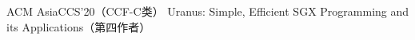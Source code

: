 \cvpub
{ACM AsiaCCS'20（CCF-C类）} %
{Uranus: Simple, Efficient SGX Programming and its Applications（第四作者）} %
{} %
{} %
{ %
}
